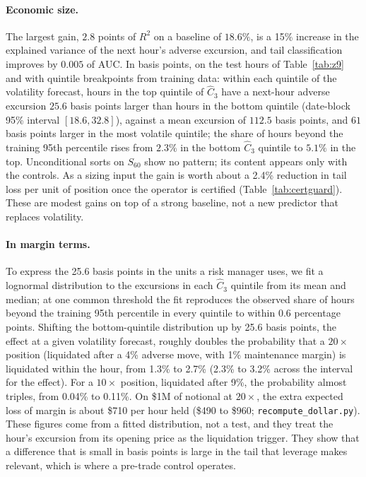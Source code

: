 \paragraph{Economic size.} The largest gain, $2.8$ points of $R^2$ on a baseline of $18.6\%$, is a 15\% increase in the explained variance of the next hour's adverse excursion, and tail classification improves by $0.005$ of AUC. In basis points, on the test hours of Table~\ref{tab:z9} and with quintile breakpoints from training data: within each quintile of the volatility forecast, hours in the top quintile of $\hat C_3$ have a next-hour adverse excursion $25.6$ basis points larger than hours in the bottom quintile (date-block 95\% interval $[18.6,32.8]$), against a mean excursion of $112.5$ basis points, and $61$ basis points larger in the most volatile quintile; the share of hours beyond the training 95th percentile rises from $2.3\%$ in the bottom $\hat C_3$ quintile to $5.1\%$ in the top. Unconditional sorts on $S_{60}$ show no pattern; its content appears only with the controls. As a sizing input the gain is worth about a 2.4\% reduction in tail loss per unit of position once the operator is certified (Table~\ref{tab:certguard}). These are modest gains on top of a strong baseline, not a new predictor that replaces volatility.

\paragraph{In margin terms.} To express the 25.6 basis points in the units a risk manager uses, we fit a lognormal distribution to the excursions in each $\hat C_3$ quintile from its mean and median; at one common threshold the fit reproduces the observed share of hours beyond the training 95th percentile in every quintile to within 0.6 percentage points. Shifting the bottom-quintile distribution up by 25.6 basis points, the effect at a given volatility forecast, roughly doubles the probability that a $20\times$ position (liquidated after a 4\% adverse move, with 1\% maintenance margin) is liquidated within the hour, from 1.3\% to 2.7\% (2.3\% to 3.2\% across the interval for the effect). For a $10\times$ position, liquidated after 9\%, the probability almost triples, from 0.04\% to 0.11\%. On \$1M of notional at $20\times$, the extra expected loss of margin is about \$710 per hour held (\$490 to \$960; \texttt{recompute\_dollar.py}). These figures come from a fitted distribution, not a test, and they treat the hour's excursion from its opening price as the liquidation trigger. They show that a difference that is small in basis points is large in the tail that leverage makes relevant, which is where a pre-trade control operates.

